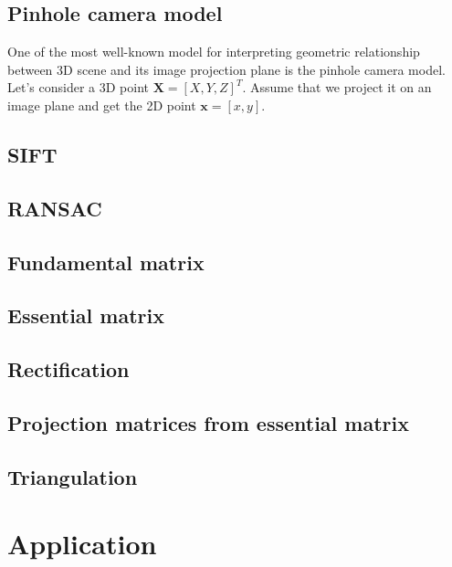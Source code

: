 \documentclass{article}
\newcommand{\mb}[1]{\mathbf{#1}}
\begin{document}
\subsection{Pinhole camera model}
\label{sec:pinhole}
One of the most well-known model for interpreting geometric relationship between 3D scene and its image projection plane is the pinhole camera model. Let's consider a 3D point $\mb{X}=[X, Y, Z]^T$. Assume that we project it on an image plane and get the 2D point $\mb{x} = [x, y]$. 

\subsection{SIFT}
\label{esc:SIFT}

\subsection{RANSAC}
\label{sec:RANSAC}

\subsection{Fundamental matrix}
\label{sec:FMat}

\subsection{Essential matrix}
\label{sec:EMat}

\subsection{Rectification}
\label{sec:rectification}

\subsection{Projection matrices from essential matrix}
\label{P_from_E}

\subsection{Triangulation}
\label{triangulation}

\pagebreak

\section{Application}
\label{sec:application}
\end{document}
